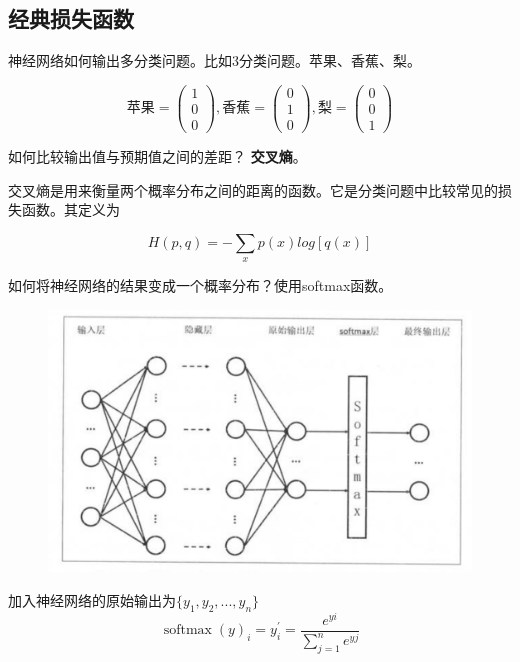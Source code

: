 \documentclass{article}\usepackage{float}\usepackage{listings} \usepackage{braket} \usepackage{amsmath,amssymb} \usepackage{geometry} \usepackage{graphicx} \usepackage{fancyvrb}\usepackage{braket} \usepackage{bm}\usepackage{hyperref} \usepackage{CJKutf8} \geometry{left=0.2cm,right=0.2cm,top=0.2cm,bottom=0.2cm} \renewcommand{\theequation}{\arabic{section}.\arabic{equation}} \renewcommand{\baselinestretch}{1.5}
\begin{document}
\begin{CJK}{UTF8}{gbsn}
\subsection{经典损失函数}
\label{sec:org5239194}

神经网络如何输出多分类问题。比如3分类问题。苹果、香蕉、梨。

\begin{displaymath}
  \mbox{苹果}=\left(
    \begin{array}{c}
      1 \\
      0 \\
      0 
    \end{array}
  \right),\mbox{香蕉}=\left(
    \begin{array}{c}
      0 \\
      1 \\
      0 
    \end{array}
  \right),\mbox{梨}=\left(
    \begin{array}{c}
      0 \\
      0 \\
      1 
    \end{array}
  \right)
\end{displaymath}

如何比较输出值与预期值之间的差距？ \textbf{交叉熵}。

交叉熵是用来衡量两个概率分布之间的距离的函数。它是分类问题中比较常见的损失函数。其定义为

\begin{displaymath}
  H(p,q)=-\sum_{x}p(x)log[q(x)]
\end{displaymath}

如何将神经网络的结果变成一个概率分布？使用softmax函数。

\begin{figure}[H]
  \centering
  \includegraphics[width=0.6\linewidth]{softchange.png}
\end{figure}

加入神经网络的原始输出为$\{y_1,y_2,...,y_n\}$
\begin{displaymath}
  \operatorname{softmax}(y)_{i}=y_{i}^{\prime}=\frac{e^{y i}}{\sum_{j=1}^{n} e^{y j}}
\end{displaymath}


\end{CJK}
\end{document}
